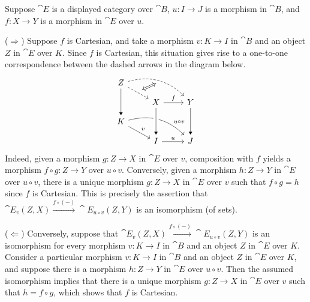 \begin{solution}
Suppose \(\cat{E}\) is a displayed category over \(\cat{B}\), \(u : I \to J\) is a morphism in \(\cat{B}\), and \(f : X \to Y\) is a morphism in \(\cat{E}\) over \(u\).

(\(\Longrightarrow\))
Suppose \(f\) is Cartesian, and take a morphism \(v : K \to I\) in \(\cat{B}\) and an object \(Z\) in \(\cat{E}\) over \(K\).
Since \(f\) is Cartesian, this situation gives rise to a one-to-one correspondence between the dashed arrows in the diagram below.
\begin{equation*}
\begin{tikzcd}[row sep=small]
Z \arrow[rd, dashed, ""{name=A}] \arrow[dd, -Triangle] \arrow[rrd, dashed, bend left, ""{name=B, below}] \\
& X \arrow[dd, -Triangle] \arrow[r, "f"] & Y \arrow[dd, -Triangle] \\
K \arrow[rd, "v"] \arrow[rrd, bend left, near end, "u \circ v"] \\
& I \arrow[r, "u"] & J
\arrow[from=uul, to=l, -Triangle, crossing over]
\arrow[from=A, to=B, Leftrightarrow]
\end{tikzcd}
\end{equation*}
Indeed, given a morphism \(g : Z \to X\) in \(\cat{E}\) over \(v\), composition with \(f\) yields a morphism \(f \circ g : Z \to Y\) over \(u \circ v\).
Conversely, given a morphism \(h :Z \to Y\) in \(\cat{E}\) over \(u \circ v\), there is a unique morphism \(g : Z \to X\) in \(\cat{E}\) over \(v\) such that \(f \circ g = h\) since \(f\) is Cartesian.
This is precisely the assertion that \(\cat{E}_v(Z, X) \xrightarrow{f \circ (-)} \cat{E}_{u \circ v}(Z, Y)\) is an isomorphism (of sets).

(\(\Longleftarrow\))
Conversely, suppose that \(\cat{E}_v(Z, X) \xrightarrow{f \circ (-)} \cat{E}_{u \circ v}(Z, Y)\) is an isomorphism for every morphism \(v : K \to I\) in \(\cat{B}\) and an object \(Z\) in \(\cat{E}\) over \(K\).
Consider a particular morphism \(v : K \to I\) in \(\cat{B}\) and an object \(Z\) in \(\cat{E}\) over \(K\), and suppose there is a morphism \(h : Z \to Y\) in \(\cat{E}\) over \(u \circ v\).
Then the assumed isomorphism implies that there is a unique morphism \(g : Z \to X\) in \(\cat{E}\) over \(v\) such that \(h = f \circ g\), which shows that \(f\) is Cartesian.
\end{solution}
